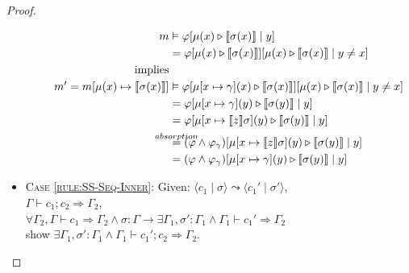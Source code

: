 \documentclass[twoside, english]{sdqthesis}
\newcommand{\tuple}[2]{\langle #1 \mid #2 \rangle}
\newcommand{\bbracket}[1]{\llbracket #1 \rrbracket}
\newcommand{\tr}[0]{\triangleright}
\theoremstyle{definition}
\begin{document}
\begin{proof}
\begin{itemize}
\begin{itemize}
        \begin{align*}
          m  &\vDash \varphi[\mu(x) \tr \bbracket{\sigma(x)} \mid y]
          \\ &= \varphi[\mu(x) \tr \bbracket{\sigma(x)}][\mu(x) \tr \bbracket{\sigma(x)} \mid y \neq x]
          \\ \text{implies} 
          \\ m' = m[\mu(x) \mapsto \bbracket{\sigma(x)}] &\vDash \varphi[\mu[x \mapsto \gamma](x) \tr \bbracket{\sigma(x)}][\mu(x) \tr \bbracket{\sigma(x)} \mid y \neq x]
          \\ &= \varphi[\mu[x \mapsto \gamma](y) \tr \bbracket{\sigma(y)} \mid y]
          \\ &= \varphi[\mu[x \mapsto \bbracket{z}\sigma](y) \tr \bbracket{\sigma(y)} \mid y]
          \\ &\overset{\mathclap{absorption}}{=} (\varphi \wedge \varphi_\gamma)[\mu[x \mapsto \bbracket{z}\sigma](y) \tr \bbracket{\sigma(y)} \mid y]
          \\ &= (\varphi \wedge \varphi_\gamma)[\mu[x \mapsto \gamma](y) \tr \bbracket{\sigma(y)} \mid y]
          \\ 
        \end{align*}
    \end{itemize} 
    




  \item \textsc{Case \cref{rule:SS-Seq-Inner}}:
    Given: $\tuple{c_1}{\sigma} \leadsto \tuple{c_1'}{\sigma'}$, \\
     $\Gamma \vdash c_1 ; c_2 \Rightarrow \Gamma_2$, \\
     $\forall \Gamma_2, \Gamma \vdash c_1 \Rightarrow \Gamma_2 \wedge \sigma : \Gamma \to \exists \Gamma_1, \sigma' : \Gamma_1 \wedge \Gamma_1 \vdash c_1' \Rightarrow \Gamma_2$ \\
    show $\exists \Gamma_1, \sigma' : \Gamma_1 \wedge \Gamma_1 \vdash c_1' ; c_2  \Rightarrow \Gamma_2$.


\end{itemize}
\end{proof}
\end{document}
